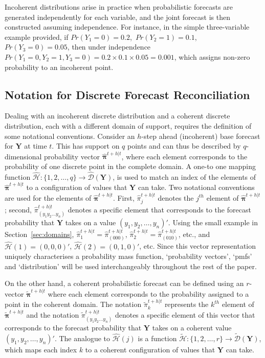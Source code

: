 \documentclass[a4paper,review,11pt,authoryear]{elsarticle}
\newcommand{\bY}{\mathbf{Y}}
\newcommand{\bpi}{\bm{\pi}}
\theoremstyle{definition}
\begin{document}
  Incoherent distributions arise in practice when probabilistic forecasts are generated independently for each variable, and the joint forecast is then constructed assuming independence. For instance, in the simple three-variable example provided, if  $Pr(Y_1=0)=0.2$,~$Pr(Y_2=1)=0.1$,~$Pr(Y_3=0)=0.05$, then under independence $Pr(Y_1=0,Y_2=1,Y_3=0)=0.2\times0.1\times0.05=0.001$, which assigns non-zero probability to an incoherent point.


  \subsection{Notation for Discrete Forecast Reconciliation}

  \label{sec:coherent_df}

  Dealing with an incoherent discrete distribution and a coherent discrete distribution, each with a different domain of support, requires the definition of some notational conventions. Consider an $h$-step ahead (incoherent) base forecast for $\bY$ at time $t$. This has support on $q$ points and can thus be described by $q$-dimensional probability vector $\hat{\bpi}^{t+h|t}$, where each element corresponds to the probability of one discrete point in the complete domain. A one-to one mapping function $\hat{\mathcal{H}}:\{1,2,\dots,q\}\rightarrow\hat{\mathcal{D}}(\bY)$, is used to match an index of the elements of $\hat{\bpi}^{t+h|t}$ to a configuration of values that $\bY$ can take. Two notational conventions are used for the elements of $\hat{\bpi}^{t+h|t}$.
  First, $\hat{\pi}_j^{t+h|t}$ denotes the $j^{th}$ element of $\hat{\bpi}^{t+h|t}$;
  second, $\hat{\pi}_{(y_1 y_2 \dots y_n)}^{t+h|t}$ denotes a specific element that corresponds to the forecast probability that $\bY$ takes on a value $(y_1,y_2,\dots,y_n)'$. 
  Using the small example in Section~\ref{sec:domains}, $\hat{\pi}_1^{t+h|t}=\hat{\pi}_{(000)}^{t+h|t}$, $\hat{\pi}_2^{t+h|t}=\hat{\pi}_{(010)}^{t+h|t}$, etc., and $\hat{\mathcal{H}}(1)=(0,0,0)'$, $\hat{\mathcal{H}}(2)=(0,1,0)'$, etc. Since this vector representation uniquely characterises a probability mass function, `probability vectors', `pmfs' and `distribution' will be used interchangeably throughout the rest of the paper.


  On the other hand, a coherent probabilistic forecast can be defined using an $r$-vector $\tilde{\bpi}^{t+h|t}$ where each element corresponds to the probability assigned to a point in the coherent domain.
  The notation $\tilde{\pi}_k^{t+h|t}$ represents the $k^{th}$ element of $\tilde{\bpi}^{t+h|t}$ and the notation $\tilde{\pi}_{(y_1 y_2 \dots y_n)}^{t+h|t}$ denotes a specific element of this vector that corresponds to the forecast probability that $\bY$ takes on a coherent value $(y_1,y_2,\dots,y_n)'$.
  The analogue to $\hat{\mathcal{H}}(j)$ is a function  $\tilde{\mathcal{H}}:\{1,2,\dots,r\}\rightarrow\tilde{\mathcal{D}}(\bY)$, which maps each index $k$ to a coherent configuration of values that $\bY$ can take.
\end{document}
